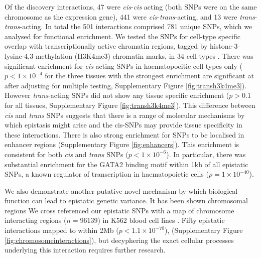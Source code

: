 \documentclass{article}
\begin{document}
Of the discovery interactions, 47 were \emph{cis}-\emph{cis} acting (both SNPs were on the same chromosome as the expression gene), 441 were \emph{cis}-\emph{trans}-acting, and 13 were \emph{trans}-\emph{trans}-acting. In total the 501 interactions comprised 781 unique SNPs, which we analysed for functional enrichment. We tested the SNPs for cell-type specific overlap with transcriptionally active chromatin regions, tagged by histone-3-lysine-4,3-methylation (H3K4me3) chromatin marks, in 34 cell types \cite{Trynka2013}. There was significant enrichment for \emph{cis}-acting SNPs in haematopoeitic cell types only ($p < 1 \times 10^{-4}$ for the three tissues with the strongest enrichment are significant at after adjusting for multiple testing, Supplementary Figure \ref{fig:transh3k4me3}). However \emph{trans}-acting SNPs did not show any tissue specific enrichment ($p > 0.1$ for all tissues, Supplementary Figure \ref{fig:transh3k4me3}). 
This difference between \emph{cis} and \emph{trans} SNPs suggests that there is a range of molecular mechanisms by which epistasis might arise and the cis-SNPs may provide tissue specificity in these interactions. There is also strong enrichment for SNPs to be localised in enhancer regions \cite{Ward2012a} (Supplementary Figure \ref{fig:enhancers}). This enrichment is consistent for both \emph{cis} and \emph{trans} SNPs ($p < 1 \times 10^{-6}$). In particular, there was substantial enrichment for the GATA2 binding motif within 1kb of all epistatic SNPs, a known regulator of transcription in haematopoietic cells \cite{Tsai1994} ($p = 1 \times 10^{-40}$).

We also demonstrate another putative novel mechanism by which biological function can lead to epistatic genetic variance. It has been shown chromosomal regions  We cross referenced our epistatic SNPs with a map of chromosome interacting regions ($n = 96139$) in K562 blood cell lines \cite{LiebermanAiden2009, Lan2012}. Fifty epistatic interactions mapped to within 2Mb ($p < 1.1 \times 10^{-70}$), (Supplementary Figure \ref{fig:chromosomeinteractions}), but decyphering the exact cellular processes underlying this interaction requires further research.
\end{document}
